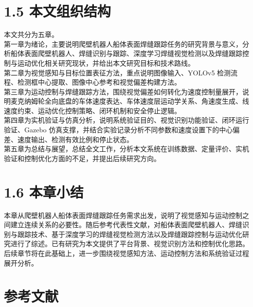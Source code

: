 \documentclass[UTF8,a4paper,12pt]{ctexrep}
\begin{document}
\section{1.5 本文组织结构}

本文共分为五章。\\

第一章为绪论，主要说明爬壁机器人船体表面焊缝跟踪任务的研究背景与意义，分析船体表面爬壁机器人、焊缝识别与跟踪、深度学习焊缝视觉检测以及焊缝跟踪控制与运动优化相关研究现状，并给出本文研究目标和技术路线。\\

第二章为视觉感知与目标位置表征方法，重点说明图像输入、YOLOv5 检测流程、检测框中心提取、图像中心参考和视觉偏差构建方法。\\

第三章为运动控制与焊缝跟踪方法，围绕视觉偏差如何转化为速度控制量展开，说明麦克纳姆轮全向底盘的车体速度表达、车体速度层运动学关系、角速度生成、线速度约束、运动优化控制策略、闭环机制和安全停止逻辑。\\

第四章为实机验证与仿真分析，说明系统验证目的、视觉识别功能验证、闭环运行验证、Gazebo 仿真支撑，并结合实验记录分析不同参数和速度设置下的中心偏差、速度输出、检测有效比例和停止状态。\\

第五章为总结与展望，总结全文工作，分析本文系统在训练数据、定量评价、实机验证和控制优化方面的不足，并提出后续研究方向。\\

\section{1.6 本章小结}

本章从爬壁机器人船体表面焊缝跟踪任务需求出发，说明了视觉感知与运动控制之间建立连续关系的必要性。随后参考代表性文献，对船体表面爬壁机器人、焊缝识别与跟踪技术、基于深度学习的焊缝视觉检测方法以及焊缝跟踪控制与运动优化研究进行了综述。已有研究为本文提供了平台背景、视觉识别方法和控制优化思路。后续章节将在此基础上，进一步围绕视觉感知方法、运动控制方法和系统验证过程展开分析。\\

\section{参考文献}
\end{document}
